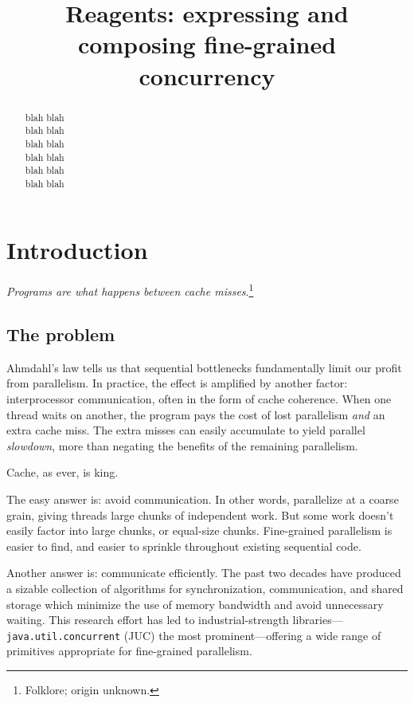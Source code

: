 \documentclass[preprint,nocopyrightspace]{sigplanconf}
\begin{document}
\authorinfo{}{}{}

\title{Reagents: expressing and composing fine-grained concurrency}
\maketitle

\begin{abstract}
blah blah\\
blah blah\\
blah blah\\
blah blah\\
blah blah\\
blah blah
\end{abstract}

\section{Introduction}

\emph{Programs are what happens between cache
  misses}.\footnote{Folklore; origin unknown.}

\subsection*{The problem}

Ahmdahl's law tells us that sequential bottlenecks fundamentally limit our
profit from parallelism.  In practice, the effect is amplified by
another factor: interprocessor communication, often in the form of cache
coherence.  When one thread waits on another, the program pays the cost of
lost parallelism \emph{and} an extra cache miss.  The extra misses can easily
accumulate to yield parallel \emph{slowdown}, more than negating the benefits
of the remaining parallelism.

Cache, as ever, is king.

The easy answer is: avoid communication.  In other words, parallelize at a
coarse grain, giving threads large chunks of independent work.  But some work
doesn't easily factor into large chunks, or equal-size chunks.  Fine-grained
parallelism is easier to find, and easier to sprinkle throughout existing
sequential code.

Another answer is: communicate efficiently.  The past two
decades have
produced a sizable collection of algorithms for synchronization, communication,
and shared storage which minimize the use of memory bandwidth and avoid
unnecessary waiting.  This research effort has led to industrial-strength
libraries---\texttt{java.util.concurrent} (JUC) the most prominent---offering a
wide range of primitives appropriate for fine-grained parallelism.
\end{document}
